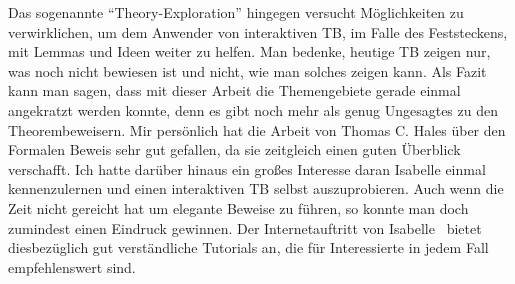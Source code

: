 Das sogenannte \enquote{Theory-Exploration} hingegen versucht Möglichkeiten zu verwirklichen, um dem Anwender von interaktiven TB, im Falle des Feststeckens, mit Lemmas und Ideen weiter zu helfen.
Man bedenke, heutige TB zeigen nur, was noch nicht bewiesen ist und nicht, wie man solches zeigen kann.
Als Fazit kann man sagen, dass mit dieser Arbeit die Themengebiete gerade einmal angekratzt werden konnte, denn es gibt noch mehr als genug Ungesagtes zu den Theorembeweisern.
Mir persönlich hat die Arbeit von Thomas C. Hales über den Formalen Beweis sehr gut gefallen, da sie zeitgleich einen guten Überblick verschafft.
Ich hatte darüber hinaus ein großes Interesse daran Isabelle einmal kennenzulernen und einen interaktiven TB selbst auszuprobieren.
Auch wenn die Zeit nicht gereicht hat um elegante Beweise zu führen, so konnte man doch zumindest einen Eindruck gewinnen.
Der Internetauftritt von Isabelle~\cite{isabellewebpage} bietet diesbezüglich gut verständliche Tutorials an, die für Interessierte in jedem Fall empfehlenswert sind.
